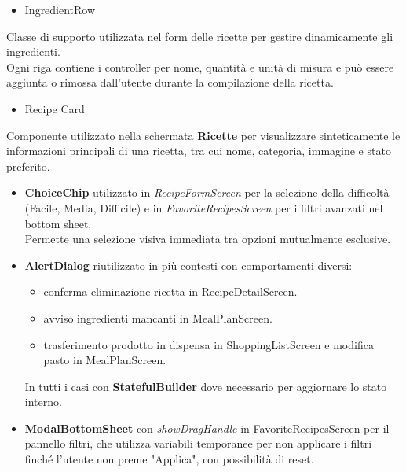 \documentclass[a4paper, 12pt]{article}
\begin{document}
\begin{itemize}
    \item IngredientRow
\end{itemize}
Classe di supporto utilizzata nel form delle ricette per gestire dinamicamente gli ingredienti.\\ 
Ogni riga contiene i controller per nome, quantità e unità di misura e può essere aggiunta o rimossa dall’utente durante la compilazione della ricetta.
\begin{itemize}
    \item Recipe Card
\end{itemize}
Componente utilizzato nella schermata \textbf{Ricette} per visualizzare sinteticamente le informazioni principali di una ricetta, tra cui nome, categoria, immagine e stato preferito.

\begin{itemize}[label=-]
    \item \textbf{ChoiceChip} utilizzato in \textit{RecipeFormScreen} per la selezione della difficoltà (Facile, Media, Difficile) e in \textit{FavoriteRecipesScreen} per i filtri avanzati nel bottom sheet. \\
    Permette una selezione visiva immediata tra opzioni mutualmente esclusive.
    \item \textbf{AlertDialog} riutilizzato in più contesti con comportamenti diversi: 
    \begin{itemize}[label=•]
        \item conferma eliminazione ricetta in RecipeDetailScreen.
        \item avviso ingredienti mancanti in MealPlanScreen.
        \item trasferimento prodotto in dispensa in ShoppingListScreen e modifica pasto in MealPlanScreen.
    \end{itemize}
    In tutti i casi con \textbf{StatefulBuilder} dove necessario per aggiornare lo stato interno.
    \item \textbf{ModalBottomSheet} con \textit{showDragHandle} in FavoriteRecipesScreen per il pannello filtri, che utilizza variabili temporanee per non applicare i filtri finché l'utente non preme "Applica", con possibilità di reset.
\end{itemize}

\newpage
\end{document}
